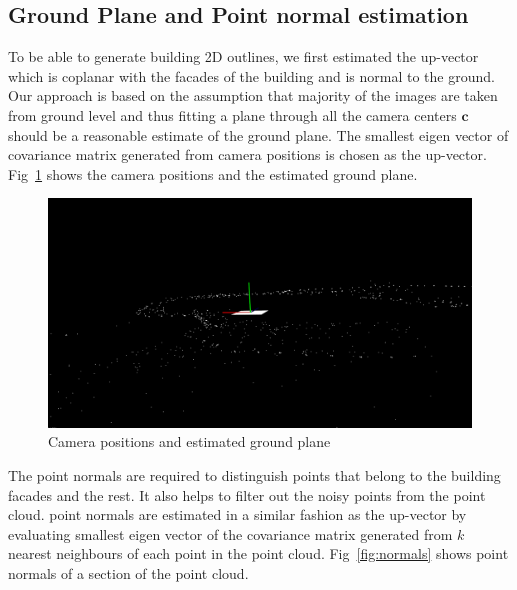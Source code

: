 \documentclass[10pt,twocolumn,letterpaper]{article}
\begin{document}
\subsection{Ground Plane and Point normal estimation}
To be able to generate building 2D outlines, we first estimated the up-vector which is coplanar with the facades of the building and is normal to the ground. Our approach is based on the assumption that majority of the images are taken from ground level and thus fitting a plane through all the camera centers $\textbf{c}$ should be a reasonable estimate of the ground plane. The smallest eigen vector of covariance matrix generated from camera positions is chosen as the up-vector. Fig~\ref{fig:ground} shows the camera positions and the estimated ground plane.

\begin{figure}[h]
   \centering
   \includegraphics[width=\linewidth]{images/ground_plane.png}
   \caption{Camera positions and estimated ground plane}
   \label{fig:ground}
\end{figure}

The point normals are required to distinguish points that belong to the building facades and the rest. It also helps to filter out the noisy points from the point cloud. point normals are estimated in a similar fashion as the up-vector by evaluating smallest eigen vector of the covariance matrix generated from $\textit{k}$ nearest neighbours of each point in the point cloud. Fig~\ref{fig:normals} shows point normals of a section of the point cloud.
\end{document}
